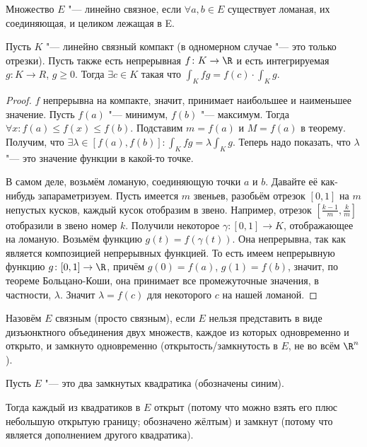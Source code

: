 \begin{Def}
	Множество $E$ "--- линейно связное, если $\forall a, b \in E$
	существует ломаная, их соединяющая, и целиком лежащая в E.
	\begin{center}
	
	\end{center}
\end{Def}
\begin{conseq}\label{23_lin_conn}
	Пусть $K$ "--- линейно связный компакт (в одномерном случае "--- это только отрезки).
	Пусть также есть непрерывная $f \colon K \to \R$ и есть интегрируемая $g \colon K \to R$, $g \ge 0$.
	Тогда $\exists c \in K$ такая что $\int_K fg = f(c) \cdot \int_K g$.
\end{conseq}
\begin{proof}
	$f$ непрерывна на компакте, значит, принимает наибольшее и наименьшее значение.
	Пусть $f(a)$ "--- минимум, $f(b)$ "--- максимум.
	Тогда $\forall x \colon f(a) \le f(x) \le f(b)$.
	Подставим $m=f(a)$ и $M=f(a)$ в теорему.
	Получим, что $\exists \lambda \in [f(a), f(b)] \colon \int_K fg = \lambda \int_K g$.
	Теперь надо показать, что $\lambda$ "--- это значение функции в какой-то точке.

	В самом деле, возьмём ломаную, соединяющую точки $a$ и $b$.
	Давайте её как-нибудь запараметризуем.
	Пусть имеется $m$ звеньев, разобьём отрезок $[0,1]$ на $m$ непустых кусков, каждый кусок отобразим в звено.
	Например, отрезок $[\frac{k-1}{m}, \frac{k}{m}]$ отобразили в звено номер $k$.
	Получили некоторое $\gamma \colon [0,1] \to K$, отображающее на ломаную.
	Возьмём функцию $g(t)=f(\gamma(t))$.
	Она непрерывна, так как является композицией непрерывных функцией.
	То есть имеем непрерывную функцию $g \colon [0,1] \to \R$, причём $g(0)=f(a)$, $g(1)=f(b)$,
	значит, по теореме Больцано-Коши, она принимает все промежуточные значения, в частности, $\lambda$.
	Значит $\lambda=f(c)$ для некоторого $c$ на нашей ломаной.
\end{proof}
\begin{Def}
	Назовём $E$ связным (просто связным), если $E$ нельзя представить в виде дизъюнктного объединения двух множеств,
	каждое из которых одновременно и открыто, и замкнуто одновременно (открытость/замкнутость в $E$, не во всём $\R^n$).
\end{Def}
\begin{exmp}
	Пусть $E$ "--- это два замкнутых квадратика (обозначены синим).
	\begin{center}
	
	\end{center}
	Тогда каждый из квадратиков в $E$ открыт (потому что можно взять его плюс небольшую открытую границу; обозначено жёлтым)
	и замкнут (потому что является дополнением другого квадратика).
\end{exmp}
